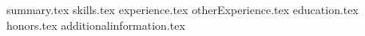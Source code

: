 \documentclass[8pt, letterpaper]{awesome-cv}
\newcommand*{\sectiondir}{resume/}
\begin{document}
\makecvheader

{summary.tex}
{skills.tex}
{experience.tex}
{otherExperience.tex}
{education.tex}
{honors.tex}
{additionalinformation.tex}
\end{document}
